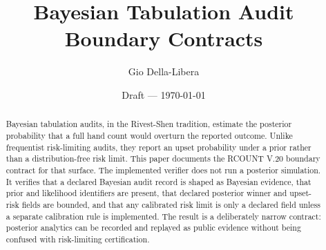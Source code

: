 \documentclass[12pt]{article}
\title{Bayesian Tabulation Audit Boundary Contracts}
\author{Gio Della-Libera}
\date{Draft --- \today}
\begin{document}
\maketitle

\begin{abstract}
Bayesian tabulation audits, in the Rivest-Shen tradition, estimate the posterior
probability that a full hand count would overturn the reported outcome. Unlike
frequentist risk-limiting audits, they report an upset probability under a
prior rather than a distribution-free risk limit. This paper documents the
RCOUNT V.20 boundary contract for that surface. The implemented verifier does
not run a posterior simulation. It verifies that a declared Bayesian audit
record is shaped as Bayesian evidence, that prior and likelihood identifiers are
present, that declared posterior winner and upset-risk fields are bounded, and
that any calibrated risk limit is only a declared field unless a separate
calibration rule is implemented. The result is a deliberately narrow contract:
posterior analytics can be recorded and replayed as public evidence without
being confused with risk-limiting certification.
\end{abstract}








\nocite{rcount-overview-2026,rcount-v20-2026}


\end{document}
